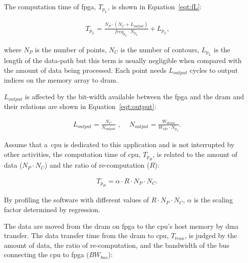 The computation time of \gls{fpga}, $T_{p_L}$, is shown in Equation~\ref{eqt:fL}:

\begin{equation}
\begin{aligned}
T_{p_L} = \frac{N_P \cdot (N_C+L_{output})}{freq_{p_L} \cdot N_{p_L}} + L_{p_L} \mbox{,}
\end{aligned}
\label{eqt:fL}
\end{equation}

where $N_P$ is the number of points, $N_C$ is the number of contours,
$L_{p_L}$ is the length of the data-path but this term is usually negligible when compared with the amount of data being processed.
Each point needs $L_{output}$ cycles to output indices on the memory array to \gls{dram}.

$L_{output}$ is affected by the bit-width available between the \gls{fpga} and the \gls{dram} and their relations are shown in Equation~\ref{eqt:output}:

\begin{equation}
\begin{aligned}
L_{output} = \frac{N_C}{N_{output}} \mbox{ , } \quad
N_{output} = \frac{W_{dram}}{W_{idx} \cdot N_{p_L}} \mbox{.}
\end{aligned}
\label{eqt:output}
\end{equation}

Assume that a~\gls{cpu} is dedicated to this application and is not interrupted by other activities,
the computation time of \gls{cpu}, $T_{p_H}$, is related to the amount of data ($N_P \cdot N_C$) and the ratio of re-computation ($R$):

\begin{equation}
\begin{aligned}
T_{p_H} = \alpha \cdot R \cdot N_P \cdot N_C \mbox{.}
\end{aligned}
\label{eqt:fH}
\end{equation}

By profiling the software with different values of $R \cdot N_P \cdot N_C$, $\alpha$ is the scaling factor determined by regression.

The data are moved from the \gls{dram} on \gls{fpga} to the \gls{cpu}'s host memory by \gls{dma} transfer.
The data transfer time from the \gls{dram} to \gls{cpu}, $T_{tran}$, is judged by the amount of data, the ratio of re-computation, and the bandwidth of the bus connecting the \gls{cpu} to \gls{fpga} ($BW_{bus}$):


